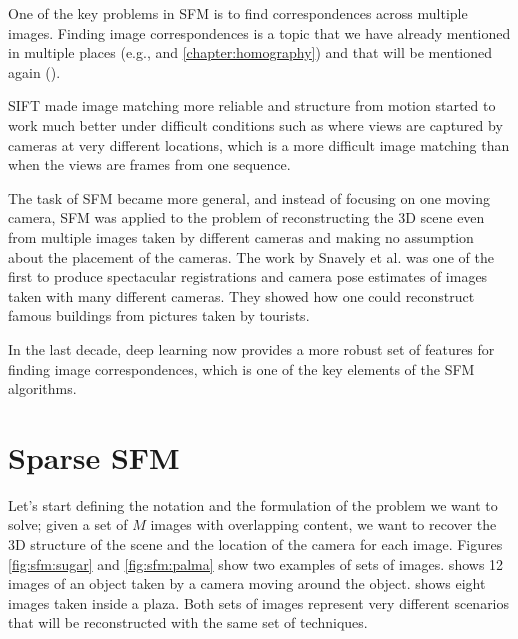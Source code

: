 



One of the key problems in SFM is to find correspondences across multiple images. Finding image correspondences is a topic that we have already mentioned in multiple places (e.g., \chap{\ref{chap:stereo_vision}} and \ref{chapter:homography}) and that will be mentioned again (\chap{\ref{chap:optical_flow_estimation}}).

SIFT \cite{Lowe04} made image matching more reliable and structure from motion started to work much better under difficult conditions such as where views are captured by cameras at very different locations, which is a more difficult image matching than when the views are frames from one sequence.   


The task of SFM became more general, and instead of focusing on one moving camera, SFM was applied to the problem of reconstructing the 3D scene even from multiple images taken by different cameras and making no assumption about the placement of the cameras.  The work by Snavely et al. \cite{Snavely2006} was one of the first to produce spectacular registrations and camera pose estimates of images taken with many different cameras. They showed how one could reconstruct famous buildings from pictures taken by tourists. 

In the last decade, deep learning now provides a more robust set of features for finding image correspondences, which is one of the key elements of the SFM algorithms.



\section{Sparse SFM}

Let's start defining the notation and the formulation of the problem we want to solve; given a set of $M$ images with overlapping content, we want to recover the 3D structure of the scene and the location of the camera for each image. Figures \ref{fig:sfm:sugar} and \ref{fig:sfm:palma} show two examples of sets of images. \Fig{\ref{fig:sfm:sugar}} shows 12 images of an object taken by a camera moving around the object. \Fig{\ref{fig:sfm:palma}} shows eight images taken inside a plaza. Both sets of images represent very different scenarios that will be reconstructed with the same set of techniques.



